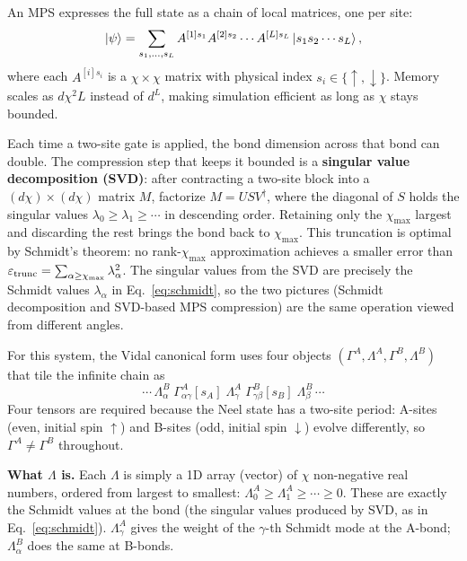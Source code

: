 \documentclass[11pt,a4paper]{article}
\begin{document}
An MPS expresses the full state as a chain of local matrices, one per site:
\begin{equation}
  \ket{\psi} = \sum_{s_1,\dots,s_L} A^{[1]s_1} A^{[2]s_2} \cdots A^{[L]s_L}
  \ket{s_1 s_2 \cdots s_L},
\end{equation}
where each $A^{[i]s_i}$ is a $\chi\times\chi$ matrix with physical index
$s_i \in \{\uparrow,\downarrow\}$. Memory scales as $d\chi^2 L$ instead of
$d^L$, making simulation efficient as long as $\chi$ stays bounded.

Each time a two-site gate is applied, the bond dimension across that bond can
double. The compression step that keeps it bounded is a \textbf{singular value
decomposition (SVD)}: after contracting a two-site block into a $(d\chi)\times(d\chi)$
matrix $M$, factorize $M = U S V^\dagger$, where the diagonal of $S$ holds
the singular values $\lambda_0 \geq \lambda_1 \geq \cdots$ in descending order.
Retaining only the $\chi_{\max}$ largest and discarding the rest brings the bond
back to $\chi_{\max}$. This truncation is optimal by Schmidt's theorem: no
rank-$\chi_{\max}$ approximation achieves a smaller error than
$\varepsilon_{\rm trunc} = \sum_{\alpha\geq\chi_{\max}}\lambda_\alpha^2$.
The singular values from the SVD are precisely the Schmidt values $\lambda_\alpha$
in Eq.~\eqref{eq:schmidt}, so the two pictures (Schmidt decomposition and
SVD-based MPS compression) are the same operation viewed from different angles.

For this system, the Vidal canonical form \cite{vidal2007} uses four objects
$(\Gamma^A, \Lambda^A, \Gamma^B, \Lambda^B)$ that tile the infinite chain as
\begin{equation*}
  \cdots\, \Lambda^B_\alpha\;\Gamma^A_{\alpha\gamma}[s_A]\;\Lambda^A_\gamma\;
  \Gamma^B_{\gamma\beta}[s_B]\;\Lambda^B_\beta \,\cdots
\end{equation*}
Four tensors are required because the Neel state has a two-site period: A-sites
(even, initial spin $\uparrow$) and B-sites (odd, initial spin $\downarrow$) evolve
differently, so $\Gamma^A \neq \Gamma^B$ throughout.

\textbf{What $\Lambda$ is.} Each $\Lambda$ is simply a 1D array (vector) of
$\chi$ non-negative real numbers, ordered from largest to smallest:
$\Lambda^A_0 \geq \Lambda^A_1 \geq \cdots \geq 0$.
These are exactly the Schmidt values at the bond (the singular values produced
by SVD, as in Eq.~\eqref{eq:schmidt}). $\Lambda^A_\gamma$ gives the weight of
the $\gamma$-th Schmidt mode at the A-bond; $\Lambda^B_\alpha$ does the same at
B-bonds.
\end{document}
